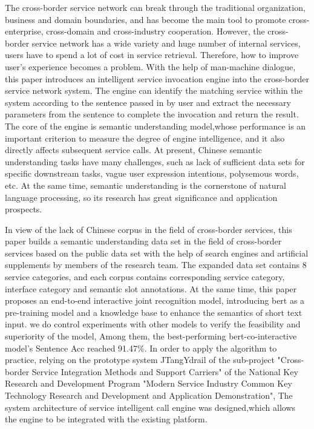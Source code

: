 \begin{englishabstract}
The cross-border service network can break through the traditional organization, business and domain boundaries, 
and has become the main tool to promote cross-enterprise, cross-domain and cross-industry cooperation. 
However, the cross-border service network has a wide variety and huge number of internal services,
users have to spend a lot of cost in service retrieval. 
Therefore, how to improve user's experience becomes a problem. With the help of man-machine dialogue, 
this paper introduces an intelligent service invocation engine into the cross-border service network system. 
The engine can identify the matching service within the system according to the sentence passed in by user
and extract the necessary parameters from the sentence to complete the invocation and return the result. 
The core of the engine is semantic understanding model,whose performance is an important criterion to measure the degree of engine intelligence, 
and it also directly affects subsequent service calls. At present, Chinese semantic understanding tasks have many challenges, 
such as lack of sufficient data sets for specific downstream tasks, vague user expression intentions, polysemous words, etc. 
At the same time, semantic understanding is the cornerstone of natural language processing, so its research has great significance and application prospects. 

In view of the lack of Chinese corpus in the field of cross-border services, 
this paper builds a semantic understanding data set in the field of cross-border services 
based on the public data set with the help of search engines and artificial supplements by members of the research team. 
The expanded data set contains 8 service categories, and each corpus contains corresponding service category, 
interface category and semantic slot annotations. At the same time, 
this paper proposes an end-to-end interactive joint recognition model, 
introducing bert as a pre-training model and a knowledge base to enhance the semantics of short text input.
we do control experiments with other models to verify the feasibility and superiority of the model,
Among them, the best-performing bert-co-interactive model's Sentence Acc reached 91.47\%. 
In order to apply the algorithm to practice, 
relying on the prototype system JTangYdrail of the sub-project "Cross-border Service Integration Methods and Support Carriers" of the National Key Research and Development Program "Modern Service Industry Common Key Technology Research and Development and Application Demonstration", 
The system architecture of service intelligent call engine was designed,which allows the engine to be integrated with the existing platform.

\end{englishabstract}
